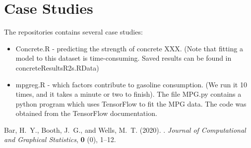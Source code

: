 \documentclass[a4paper,12pt]{article}
\begin{document}
\section{Case Studies}
The repositories contains several case studies:
\begin{itemize}
 \item Concrete.R - predicting the strength of concrete XXX. (Note that fitting a model to this dataset is time-consuming. Saved results can be found in concreteResultsR2s.RData)
 \item mpgreg.R - which factors contribute to gasoline consumption. (We run it 10 times, and it takes a minute or two to finish). The file MPG.py contains a python program which uses TensorFlow to fit the MPG data. The code was obtained from the TensorFlow documentation.
\end{itemize}




\begin{thebibliography}{99}
{\rm Bar, H.~Y., Booth, J.~G., {\rm and} Wells, M.~T.} (2020).
.
\newblock \emph{Journal of Computational and Graphical Statistics}, {\bf  0} (0),  1--12.
\end{thebibliography}
\end{document}
